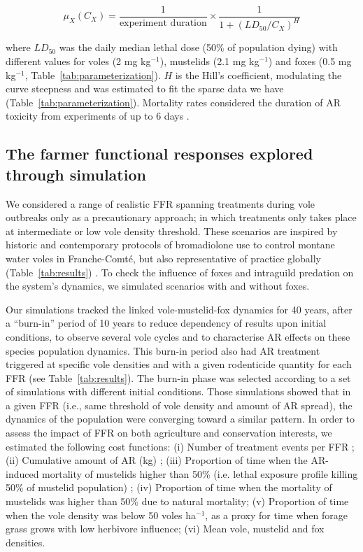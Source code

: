 \documentclass[11pt]{article}
\begin{document}
\begin{equation}
\mu_X(C_X) = \dfrac{1}{\text{experiment duration}} \times \dfrac{1}{1+ (LD_{50}/C_X)^H}
\end{equation}

where $LD_{50}$ was the daily median lethal dose (50\% of population dying) with different values for voles (2 mg kg$^{-1}$), mustelids (2.1 mg kg$^{-1}$) and foxes (0.5 mg kg$^{-1}$, Table~\ref{tab:parameterization}). $H$ is the Hill's coefficient, modulating the curve steepness and was estimated to fit the sparse data we have (Table~\ref{tab:parameterization}). Mortality rates considered the duration of AR toxicity from experiments of up to 6 days \citep{Sage2010}.

\subsection{The farmer functional responses explored through simulation}

We considered a range of realistic FFR spanning treatments during vole outbreaks only as a precautionary approach; in which treatments only takes place at intermediate or low vole density threshold. These scenarios are inspired by historic and contemporary protocols of bromadiolone use to control montane water voles in Franche-Comté, but also representative of practice globally (Table~\ref{tab:results}) \citep{Delattre2009}. To check the influence of foxes and intraguild predation on the system’s dynamics, we simulated scenarios with and without foxes.

Our simulations tracked the linked vole-mustelid-fox dynamics for 40 years, after a “burn-in” period of 10 years to reduce dependency of results upon initial conditions, to observe several vole cycles and to characterise AR effects on these species population dynamics. This burn-in period also had AR treatment triggered at specific vole densities and with a given rodenticide quantity for each FFR (see Table~\ref{tab:results}). The burn-in phase was selected according to a set of simulations with different initial conditions. Those simulations showed that in a given FFR (i.e., same threshold of vole density and amount of AR spread), the dynamics of the population were converging toward a similar pattern. 
In order to assess the impact of FFR on both agriculture and conservation interests, we estimated the following cost functions: (i) Number of treatment events per FFR ; (ii) Cumulative amount of AR (kg) ; (iii) Proportion of time when the AR-induced mortality of mustelids higher than 50\% (i.e. lethal exposure profile killing 50\% of mustelid population) ; (iv) Proportion of time when the mortality of mustelids was higher than 50\% due to natural mortality; (v) Proportion of time when the vole density was below 50 voles ha$^{-1}$, as a proxy for time when forage grass grows with low herbivore influence; (vi) Mean vole, mustelid and fox densities.
\end{document}
